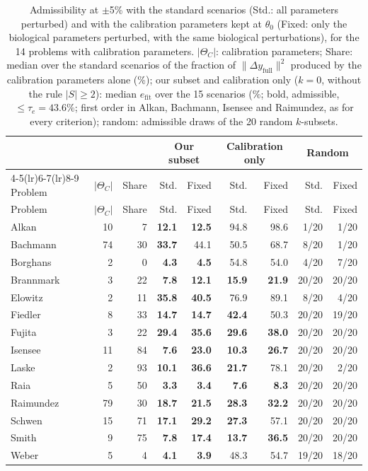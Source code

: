 \begin{longtable}{@{}lrrrrrrrr@{}}
\caption{Admissibility at $\pm$5\% with the standard scenarios (Std.: all parameters perturbed) and with the calibration parameters kept at $\theta_0$ (Fixed: only the biological parameters perturbed, with the same biological perturbations), for the 14 problems with calibration parameters. $|\Theta_C|$: calibration parameters; Share: median over the standard scenarios of the fraction of $\|\Delta y_{\mathrm{full}}\|^2$ produced by the calibration parameters alone (\%); our subset and calibration only ($k=0$, without the rule $|S|\ge2$): median $e_{\mathrm{fit}}$ over the 15 scenarios (\%; bold, admissible, $\le\tau_e=43.6\%$; first order in Alkan, Bachmann, Isensee and Raimundez, as for every criterion); random: admissible draws of the 20 random $k$-subsets.}\label{tab:calfixed}\\
\toprule
 & & & \multicolumn{2}{c}{Our subset} & \multicolumn{2}{c}{Calibration only} & \multicolumn{2}{c}{Random} \\
\cmidrule(lr){4-5}\cmidrule(lr){6-7}\cmidrule(lr){8-9}
Problem & $|\Theta_C|$ & Share & Std. & Fixed & Std. & Fixed & Std. & Fixed \\
\midrule
\endfirsthead
\toprule
Problem & $|\Theta_C|$ & Share & Std. & Fixed & Std. & Fixed & Std. & Fixed \\
\midrule
\endhead
Alkan & 10 & 7 & \textbf{12.1} & \textbf{12.5} & 94.8 & 98.6 & 1/20 & 1/20 \\
Bachmann & 74 & 30 & \textbf{33.7} & 44.1 & 50.5 & 68.7 & 8/20 & 1/20 \\
Borghans & 2 & 0 & \textbf{4.3} & \textbf{4.5} & 54.8 & 54.0 & 4/20 & 7/20 \\
Brannmark & 3 & 22 & \textbf{7.8} & \textbf{12.1} & \textbf{15.9} & \textbf{21.9} & 20/20 & 20/20 \\
Elowitz & 2 & 11 & \textbf{35.8} & \textbf{40.5} & 76.9 & 89.1 & 8/20 & 4/20 \\
Fiedler & 8 & 33 & \textbf{14.7} & \textbf{14.7} & \textbf{42.4} & 50.3 & 20/20 & 19/20 \\
Fujita & 3 & 22 & \textbf{29.4} & \textbf{35.6} & \textbf{29.6} & \textbf{38.0} & 20/20 & 20/20 \\
Isensee & 11 & 84 & \textbf{7.6} & \textbf{23.0} & \textbf{10.3} & \textbf{26.7} & 20/20 & 20/20 \\
Laske & 2 & 93 & \textbf{10.1} & \textbf{36.6} & \textbf{21.7} & 78.1 & 20/20 & 2/20 \\
Raia & 5 & 50 & \textbf{3.3} & \textbf{3.4} & \textbf{7.6} & \textbf{8.3} & 20/20 & 20/20 \\
Raimundez & 79 & 30 & \textbf{18.7} & \textbf{21.5} & \textbf{28.3} & \textbf{32.2} & 20/20 & 20/20 \\
Schwen & 15 & 71 & \textbf{17.1} & \textbf{29.2} & \textbf{27.3} & 57.1 & 20/20 & 20/20 \\
Smith & 9 & 75 & \textbf{7.8} & \textbf{17.4} & \textbf{13.7} & \textbf{36.5} & 20/20 & 20/20 \\
Weber & 5 & 4 & \textbf{4.1} & \textbf{3.9} & 48.3 & 54.7 & 19/20 & 18/20 \\
\bottomrule
\end{longtable}
